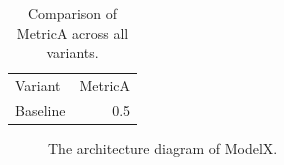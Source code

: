 \begin{table}[t]
  \centering
  \caption{Comparison of MetricA across all variants.}
  \label{tab:main}
  \begin{tabular}{lr}
    Variant & MetricA \\
    Baseline & 0.5 \\
  \end{tabular}
\end{table}
\begin{figure}[t]
  \centering
  \caption{The architecture diagram of ModelX.}
  \label{fig:arch}
\end{figure}
